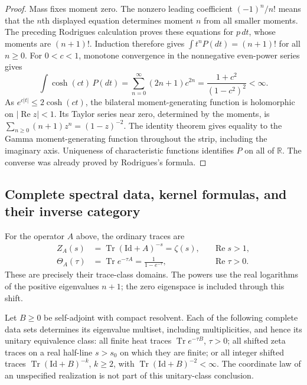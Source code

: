 \begin{proof}
Mass fixes moment zero.  The nonzero leading coefficient
$(-1)^n/n!$ means that the $n$th displayed equation determines moment
$n$ from all smaller moments.  The preceding Rodrigues calculation
proves these equations for $p\,dt$, whose moments are $(n+1)!$.
Induction therefore gives $\int t^nP(dt)=(n+1)!$ for all $n\geq0$.
For $0<c<1$, monotone convergence in the nonnegative even-power
series gives
\[
 \int\cosh(ct)\,P(dt)
 =\sum_{n=0}^\infty(2n+1)c^{2n}
 =\frac{1+c^2}{(1-c^2)^2}<\infty.
\]
As $e^{c|t|}\leq2\cosh(ct)$, the bilateral moment-generating
function is holomorphic on $|\operatorname{Re}z|<1$.
Its Taylor series near zero, determined by the moments, is
$\sum_{n\geq0}(n+1)z^n=(1-z)^{-2}$.
The identity theorem gives equality to the Gamma moment-generating
function throughout the strip, including the imaginary axis.
Uniqueness of characteristic functions identifies $P$ on all of
$\mathbb R$.  The converse was already proved by Rodrigues's formula.
\end{proof}

\subsection{Complete spectral data, kernel formulas, and their inverse category}

\begin{theorem}
\label{final:O4}
For the operator $A$ above, the ordinary traces are
\begin{align}
 Z_A(s)&=\operatorname{Tr}(\mathrm{Id}+A)^{-s}=\zeta(s),
 &&\operatorname{Re}s>1,\label{final:O4-zeta}\\
 \Theta_A(\tau)&=\operatorname{Tr}e^{-\tau A}
       =\frac1{1-e^{-\tau}},
 &&\operatorname{Re}\tau>0.\label{final:O4-heat-trace}
\end{align}
These are precisely their trace-class domains.  The powers use the
real logarithms of the positive eigenvalues $n+1$; the zero eigenspace
is included through this shift.

Let $B\geq0$ be self-adjoint with compact resolvent.  Each of the
following complete data sets determines its eigenvalue multiset,
including multiplicities, and hence its unitary equivalence class:
all finite heat traces $\operatorname{Tr}e^{-\tau B}$, $\tau>0$;
all shifted zeta traces on a real half-line $s>s_0$ on which they are
finite; or all integer shifted traces
$\operatorname{Tr}(\mathrm{Id}+B)^{-k}$, $k\geq2$, with
$\operatorname{Tr}(\mathrm{Id}+B)^{-2}<\infty$.
The coordinate law of an unspecified realization is not part of this
unitary-class conclusion.
\end{theorem}

